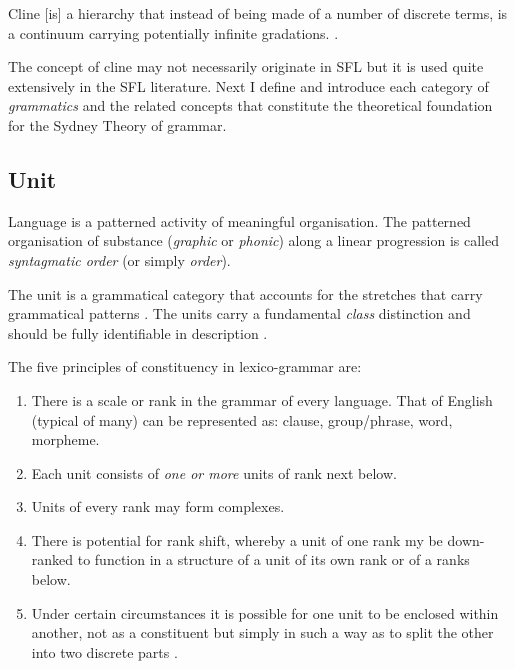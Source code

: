     \begin{definition}[Cline]\label{def:cline}
    	Cline [is] a hierarchy that instead of being made of a number of discrete terms, is a continuum carrying potentially infinite gradations.
    	\citep[42]{Halliday2002}. 
    \end{definition}

    The concept of cline may not necessarily originate in SFL but it is used quite extensively in the SFL literature.
    Next I define and introduce each category of \textit{grammatics} and the related concepts that constitute the theoretical foundation for the Sydney Theory of grammar.

\subsection{Unit}
\label{sec:unit-sydney}
    Language is a patterned activity of meaningful organisation. The patterned organisation of substance (\textit{graphic} or \textit{phonic}) along a linear progression is called \textit{syntagmatic order} (or simply \textit{order}). 
    
    \begin{definition}[Unit]\label{def:unit}
    	The unit is a grammatical category that accounts for the stretches that carry grammatical patterns \citep[42]{Halliday2002}.
    	The units carry a fundamental \textit{class} distinction and should be fully identifiable in description \citep[45]{Halliday2002}.
    \end{definition}
    
    \begin{generalization}\label{def:constituency-principles}
    	The five principles of constituency in lexico-grammar are:
    	\begin{enumerate}
    		\item There is a scale or rank in the grammar of every language. That of English (typical of many) can be represented as: clause, group/phrase, word, morpheme.
    		\item Each unit consists of \textit{one or more} units of rank next below.
    		\item Units of every rank may form complexes.
    		\item\label{item:downrank} There is potential for rank shift, whereby a unit of one rank my be down-ranked to function in a structure of a unit of its own rank or of a ranks below.
    		\item\label{item:unit-split} Under certain circumstances it is possible for one unit to be enclosed within another, not as a constituent but simply in such a way as to split the other into two discrete parts \citep[9--10]{Halliday2013}.
    	\end{enumerate}
    \end{generalization}
    
